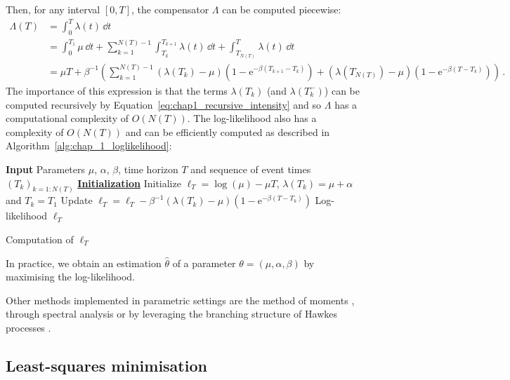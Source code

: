 Then, for any interval $[0, T]$, the compensator $\Lambda$ can be computed piecewise:
\begin{align*}
    \Lambda(T) &= \int_{0}^{T}{\lambda(t)\,\dd t}\\
    &= \int_{0}^{T_1}{\mu\,\dd t} + \sum_{k=1}^{N(T)-1}\int_{T_k}^{T_{k+1}}{\lambda(t)\,\dd t} + \int_{T_{N(T)}}^{T}{\lambda(t)\,\dd t}\\
    &= \mu T + \beta^{-1}\left(\sum_{k=1}^{N(T)-1}{(\lambda(T_k) - \mu)(1 - \mathrm{e}^{-\beta(T_{k+1} - T_k)})} + (\lambda(T_{N(T)}) - \mu)(1 - \mathrm{e}^{-\beta(T - T_k)})\right)\,.
\end{align*}
The importance of this expression is that the terms $\lambda(T_k)$ (and $\lambda(T_k^-)$) can be computed recursively by Equation~\ref{eq:chap1_recursive_intensity} and so $\Lambda$ has a computational complexity of $O(N(T))$. 
The log-likelihood also has a complexity of $O(N(T))$ and can be efficiently computed as described in Algorithm~\ref{alg:chap_1_loglikelihood}:

\begin{algorithm}[ht]
    \SetAlgoLined
     \textbf{Input} Parameters $\mu$, $\alpha$, $\beta$, time horizon $T$ and sequence of event times $(T_k)_{k=1:N(T)}$\;
     \textbf{\underline{Initialization}} Initialize $\ell_T = \log(\mu) - \mu T$, $\lambda(T_k) = \mu + \alpha$ and $T_{k} = T_1$\;
    Update $\ell_T = \ell_T - \beta^{-1}(\lambda(T_k) - \mu)(1 - \mathrm{e}^{-\beta(T - T_k)})$\;
     \Return Log-likelihood $\ell_T$
     \caption{Computation of $\ell_T$}
     \label{alg:chap_1_loglikelihood}
\end{algorithm}

In practice, we obtain an estimation $\hat \theta$ of a parameter $\theta = (\mu, \alpha, \beta)$ by maximising the log-likelihood.

Other methods implemented in parametric settings are the method of moments \parencite{DaFonseca2013}, through spectral analysis \parencite{Adamopoulos1976} or by leveraging the branching structure of Hawkes processes \parencite{Veen2008}.

\subsection{Least-squares minimisation}

